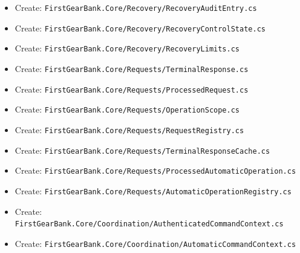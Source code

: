 \documentclass[
  10pt,
  letterpaper,
]{article}
\begin{document}
\begin{itemize}
  Create:
  \texttt{FirstGearBank.}\allowbreak{}\texttt{Core/}\allowbreak{}\texttt{Recovery/}\allowbreak{}\texttt{ArchivedRecoveryEvidence.}\allowbreak{}\texttt{cs}
\item
  Create:
  \texttt{FirstGearBank.}\allowbreak{}\texttt{Core/}\allowbreak{}\texttt{Recovery/}\allowbreak{}\texttt{RecoveryAuditEntry.}\allowbreak{}\texttt{cs}
\item
  Create:
  \texttt{FirstGearBank.}\allowbreak{}\texttt{Core/}\allowbreak{}\texttt{Recovery/}\allowbreak{}\texttt{RecoveryControlState.}\allowbreak{}\texttt{cs}
\item
  Create:
  \texttt{FirstGearBank.}\allowbreak{}\texttt{Core/}\allowbreak{}\texttt{Recovery/}\allowbreak{}\texttt{RecoveryLimits.}\allowbreak{}\texttt{cs}
\item
  Create:
  \texttt{FirstGearBank.}\allowbreak{}\texttt{Core/}\allowbreak{}\texttt{Requests/}\allowbreak{}\texttt{TerminalResponse.}\allowbreak{}\texttt{cs}
\item
  Create:
  \texttt{FirstGearBank.}\allowbreak{}\texttt{Core/}\allowbreak{}\texttt{Requests/}\allowbreak{}\texttt{ProcessedRequest.}\allowbreak{}\texttt{cs}
\item
  Create:
  \texttt{FirstGearBank.}\allowbreak{}\texttt{Core/}\allowbreak{}\texttt{Requests/}\allowbreak{}\texttt{OperationScope.}\allowbreak{}\texttt{cs}
\item
  Create:
  \texttt{FirstGearBank.}\allowbreak{}\texttt{Core/}\allowbreak{}\texttt{Requests/}\allowbreak{}\texttt{RequestRegistry.}\allowbreak{}\texttt{cs}
\item
  Create:
  \texttt{FirstGearBank.}\allowbreak{}\texttt{Core/}\allowbreak{}\texttt{Requests/}\allowbreak{}\texttt{TerminalResponseCache.}\allowbreak{}\texttt{cs}
\item
  Create:
  \texttt{FirstGearBank.}\allowbreak{}\texttt{Core/}\allowbreak{}\texttt{Requests/}\allowbreak{}\texttt{ProcessedAutomaticOperation.}\allowbreak{}\texttt{cs}
\item
  Create:
  \texttt{FirstGearBank.}\allowbreak{}\texttt{Core/}\allowbreak{}\texttt{Requests/}\allowbreak{}\texttt{AutomaticOperationRegistry.}\allowbreak{}\texttt{cs}
\item
  Create:
  \texttt{FirstGearBank.}\allowbreak{}\texttt{Core/}\allowbreak{}\texttt{Coordination/}\allowbreak{}\texttt{AuthenticatedCommandContext.}\allowbreak{}\texttt{cs}
\item
  Create:
  \texttt{FirstGearBank.}\allowbreak{}\texttt{Core/}\allowbreak{}\texttt{Coordination/}\allowbreak{}\texttt{AutomaticCommandContext.}\allowbreak{}\texttt{cs}

\end{itemize}
\end{document}

